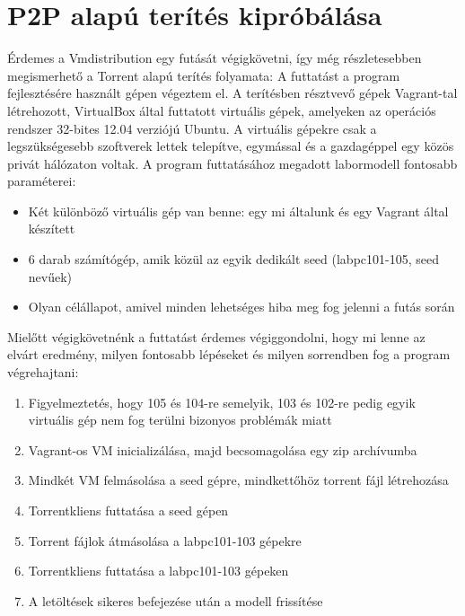 \section{P2P alapú terítés kipróbálása}

Érdemes a Vmdistribution egy futását végigkövetni, így még részletesebben megismerhető a Torrent alapú terítés folyamata:
A futtatást a program fejlesztésére használt gépen végeztem el. A terítésben résztvevő gépek Vagrant-tal létrehozott, VirtualBox által futtatott virtuális gépek, amelyeken az operációs rendszer 32-bites 12.04 verziójú Ubuntu\cite{ubuntu}. A virtuális gépekre csak a legszükségesebb szoftverek lettek telepítve, egymással és a gazdagéppel egy közös privát hálózaton voltak. A program futtatásához megadott labormodell fontosabb paraméterei:

\begin{itemize}
  \item Két különböző virtuális gép van benne: egy mi általunk és egy Vagrant által készített
  \item 6 darab számítógép, amik közül az egyik dedikált seed (labpc101-105, seed nevűek)
  \item Olyan célállapot, amivel minden lehetséges hiba meg fog jelenni a futás során
\end{itemize}

Mielőtt végigkövetnénk a futtatást érdemes végiggondolni, hogy mi lenne az elvárt eredmény, milyen fontosabb lépéseket és milyen sorrendben fog a program végrehajtani:

\begin{enumerate}
  \item Figyelmeztetés, hogy 105 és 104-re semelyik, 103 és 102-re pedig egyik virtuális gép nem fog terülni bizonyos problémák miatt
  \item Vagrant-os VM inicializálása, majd becsomagolása egy zip archívumba
  \item Mindkét VM felmásolása a seed gépre, mindkettőhöz torrent fájl létrehozása
  \item Torrentkliens futtatása a seed gépen
  \item Torrent fájlok átmásolása a labpc101-103 gépekre
  \item Torrentkliens futtatása a labpc101-103 gépeken
  \item A letöltések sikeres befejezése után a modell frissítése
\end{enumerate}

